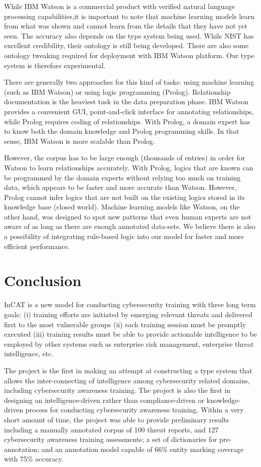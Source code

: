 \documentclass{article} %
\begin{document}
While IBM Watson is a commercial product with verified natural language processing capabilities,it is important to note that machine learning models learn from what was shown and cannot learn from the details that they have not yet seen. The accuracy also depends on the type system being used. While NIST has excellent credibility, their ontology is still being developed. There are also some ontology tweaking required for deployment with IBM Watson platform. Our type system is therefore experimental.

There are generally two approaches for this kind of tasks: using machine learning (such as IBM Watson) or using logic programming (Prolog). Relationship documentation is the heaviest task in the data preparation phase. IBM Watson provides a convenient GUI, point-and-click interface for annotating relationships, while Prolog requires coding of relationships. With Prolog, a domain expert has to know both the domain knowledge and Prolog programming skills. In that sense, IBM Watson is more scalable than Prolog.

However, the corpus has to be large enough (thousands of entries) in order for Watson to learn relationships accurately. With Prolog, logics that are known can be programmed by the domain experts without relying too much on training data, which appears to be faster and more accurate than Watson. However, Prolog cannot infer logics that are not built on the existing logics stored in its knowledge base (closed world). Machine learning models like Watson, on the other hand, was designed to spot new patterns that even human experts are not aware of as long as there are enough annotated data-sets. We believe there is also a possibility of integrating rule-based logic into our model for faster and more efficient performance.

\section{Conclusion}
InCAT is a new model for conducting cybersecurity training with three long term goals: (i) training efforts are initiated by emerging relevant threats and delivered first to the most vulnerable groups (ii) each training session must be promptly executed (iii) training results must be able to provide actionable intelligence to be employed by other systems such as enterprise risk management, enterprise threat intelligence, etc.

The project is the first in making an attempt at constructing a type system that allows the inter-connecting of intelligence among cybersecurity related domains, including cybersecurity awareness training. The project is also the first in designing an intelligence-driven rather than compliance-driven or knowledge-driven process for conducting cybersecurity awareness training. Within a very short amount of time, the project was able to provide preliminary results including a manually annotated corpus of 100 threat reports, and 127 cybersecurity awareness training assessments; a set of dictionaries for pre-annotation; and an annotation model capable of 66\% entity marking coverage with 75\% accuracy.
\end{document}
